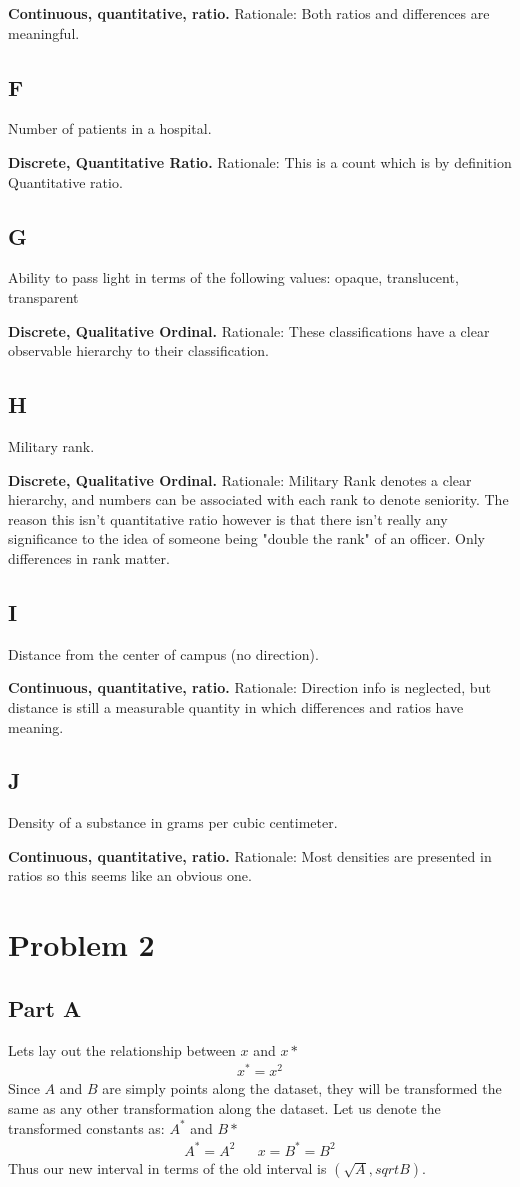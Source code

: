 \documentclass{article}
\begin{document}
\textbf{Continuous, quantitative, ratio.}
Rationale: Both ratios and differences are meaningful.
\subsection*{F}
Number of patients in a hospital.

\textbf{Discrete, Quantitative Ratio.}
Rationale: This is a count which is by definition Quantitative ratio.
\subsection*{G}
Ability to pass light in terms of the following values: opaque, translucent, transparent

\textbf{Discrete, Qualitative Ordinal.}
Rationale: These classifications have a clear observable hierarchy to their classification.
\subsection*{H}
Military rank.

\textbf{Discrete, Qualitative Ordinal.}
Rationale: Military Rank denotes a clear hierarchy, and numbers can be associated with each rank to denote seniority. The reason this isn't quantitative ratio however is that there isn't really any significance to the idea of someone being "double the rank" of an officer. Only differences in rank matter.
\subsection*{I}
 Distance from the center of campus (no direction).

\textbf{Continuous, quantitative, ratio.}
Rationale: Direction info is neglected, but distance is still a measurable quantity in which differences and ratios have meaning.
\subsection*{J}
Density of a substance in grams per cubic centimeter.

\textbf{Continuous, quantitative, ratio.}
Rationale: Most densities are presented in ratios so this seems like an obvious one.
\clearpage

\section*{Problem 2}
\subsection*{Part A}
Lets lay out the relationship between $x$ and $x*$
\begin{align*}
x^* = x^2
\end{align*}
Since $A$ and $B$ are simply points along the dataset, they will be transformed the same as any other transformation along the dataset. Let us denote the transformed constants as: $A^*$ and $B*$
\begin{align*}
\boxed{A^* = A^2} && \boxed{x = B^* = B^2}
\end{align*}
Thus our new interval in terms of the old interval is $(\sqrt{A},sqrt{B})$.
\end{document}
